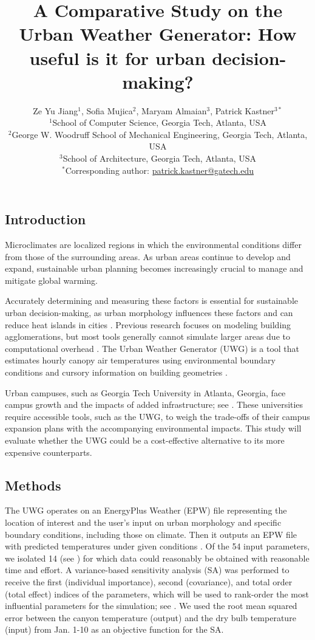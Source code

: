 \documentclass[a4paper, 12pt]{article}
\title{\large\textbf{A Comparative Study on the Urban Weather Generator: How useful is it for urban decision-making?}}
\author{
\normalsize
Ze Yu Jiang$^{1}$, Sofia Mujica$^{2}$, Maryam Almaian$^{3}$, Patrick Kastner$^{3*}$\\
        \small $^{1}$School of Computer Science, Georgia Tech, Atlanta, USA \\
        \small $^{2}$George W. Woodruff School of Mechanical Engineering, Georgia Tech, Atlanta, USA \\
        \small $^{3}$School of Architecture, Georgia Tech, Atlanta, USA \\
        \small $^{*}$Corresponding author: \href{patrick.kastner@gatech.edu}{patrick.kastner@gatech.edu} \\
}
\date{}
\begin{document}
\maketitle
\thispagestyle{fancy} %

\vspace{-1.5cm}

\subsection*{Introduction}

Microclimates are localized regions in which the environmental conditions differ from those of the surrounding areas. 
As urban areas continue to develop and expand, sustainable urban planning becomes increasingly crucial to manage and mitigate global warming.


Accurately determining and measuring these factors is essential for sustainable urban decision-making, as urban morphology influences these factors and can reduce heat islands in cities \citep{tehrani_predicting_2024}.
Previous research focuses on modeling building agglomerations, but most tools generally cannot simulate larger areas due to computational overhead \citep{singh_recent_2024}.
The Urban Weather Generator (UWG) is a tool that estimates hourly canopy air temperatures using environmental boundary conditions and cursory information on building geometries \citep{mao_urban_2021}.

Urban campuses, such as Georgia Tech University in Atlanta, Georgia, face campus growth and the impacts of added infrastructure; see .
These universities require accessible tools, such as the UWG, to weigh the trade-offs of their campus expansion plans with the accompanying environmental impacts.
This study will evaluate whether the UWG could be a cost-effective alternative to its more expensive counterparts.



\subsection*{Methods}
The UWG operates on an EnergyPlus Weather (EPW) file representing the location of interest and the user's input on urban morphology and specific boundary conditions, including those on climate. 
Then it outputs an EPW file with predicted temperatures under given conditions \citep{nakano2015urban}.
Of the 54 input parameters, we isolated 14 (see )  for which data could reasonably be obtained with reasonable time and effort.
A variance-based sensitivity analysis (SA) \citep{lo_piano_variance-based_2021} was performed to receive the first (individual importance), second (covariance), and total order (total effect) indices of the parameters, which will be used to rank-order the most influential parameters for the simulation; see .
We used the root mean squared error between the canyon temperature (output) and the dry bulb temperature (input) from Jan. 1-10 as an objective function for the SA.
\end{document}
